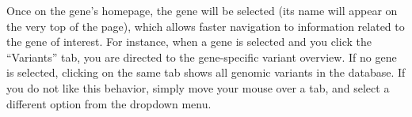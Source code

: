 \documentclass[a4paper,oneside,openany,12pt]{memoir}
\begin{document}
Once on the gene's homepage, the gene will be selected (its name will appear on the very top of the page),
 which allows faster navigation to information related to the gene of interest.
For instance, when a gene is selected and you click the ``Variants'' tab, you are directed to the gene-specific variant overview.
If no gene is selected, clicking on the same tab shows all genomic variants in the database.
If you do not like this behavior, simply move your mouse over a tab, and select a different option from the dropdown menu.
%
\end{document}
